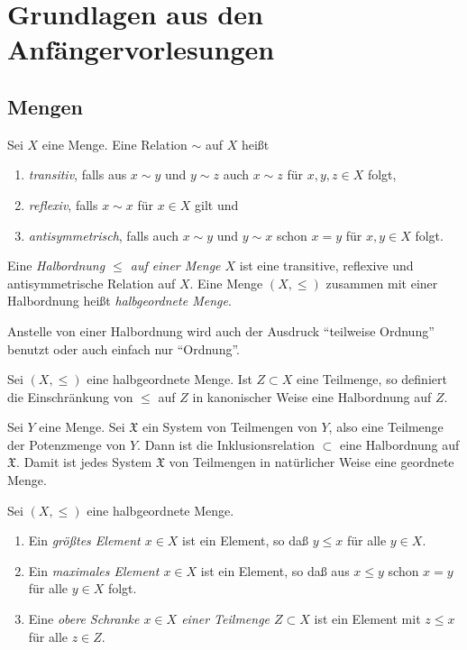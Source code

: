 \section{Grundlagen aus den Anfängervorlesungen}

\subsection{Mengen}

\begin{definition}
	Sei \(X\) eine Menge. Eine Relation \(\sim\) auf \(X\) heißt
	\begin{enumerate}
	\item
		\emph{transitiv}, falls aus \(x \sim y\) und \(y \sim z\) auch \(x \sim z\) für \(x, y, z \in X\) folgt,
	\item
		\emph{reflexiv}, falls \(x \sim x\) für \(x \in X\) gilt und
	\item
		\emph{antisymmetrisch}, falls auch \(x \sim y\) und \(y \sim x\) schon \(x = y\) für \(x, y \in X\) folgt.
	\end{enumerate}
\end{definition}

\begin{definition}
	Eine \emph{Halbordnung \(\le\) auf einer Menge \(X\)} ist eine transitive, reflexive und antisymmetrische Relation auf \(X\).
	Eine Menge \((X, \le)\) zusammen mit einer Halbordnung heißt \emph{halbgeordnete Menge}.
\end{definition}

Anstelle von einer Halbordnung wird auch der Ausdruck "`teilweise Ordnung"' benutzt oder auch einfach nur "`Ordnung"'.

\begin{example}
	Sei \((X, \le)\) eine halbgeordnete Menge. Ist \(Z \subset X\) eine Teilmenge, so definiert die Einschränkung von
	\(\le\) auf \(Z\) in kanonischer Weise eine Halbordnung auf \(Z\).
\end{example}

\begin{example}
	Sei \(Y\) eine Menge. Sei \(\mathfrak X\) ein System von Teilmengen von \(Y\), also eine Teilmenge der Potenzmenge von
	\(Y\). Dann ist die Inklusionsrelation \(\subset\) eine Halbordnung auf \(\mathfrak X\). Damit ist jedes System \(\mathfrak X\)
	von Teilmengen in natürlicher Weise eine geordnete Menge.
\end{example}

\begin{definition}
	Sei \((X, \le)\) eine halbgeordnete Menge.
	\begin{enumerate}
	\item
		Ein \emph{größtes Element \(x \in X\)} ist ein Element, so daß \(y \le x\) für alle \(y \in X\).
	\item
		Ein \emph{maximales Element \(x \in X\)} ist ein Element, so daß aus \(x \le y\) schon \(x = y\) für alle \(y \in X\) folgt.
	\item
		Eine \emph{obere Schranke \(x \in X\) einer Teilmenge \(Z \subset X\)} ist ein Element mit \(z \le x\) für alle \(z \in Z\).
	\end{enumerate}
\end{definition}

